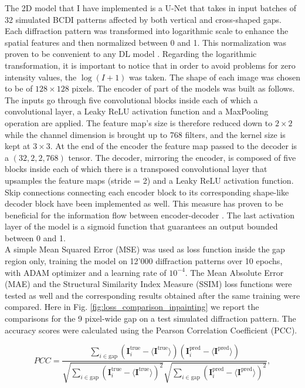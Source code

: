 The 2D model that I have implemented is a U-Net that takes in input batches of 32 simulated BCDI patterns affected 
by both vertical and cross-shaped gaps. Each diffraction pattern was transformed into logarithmic scale to enhance the 
spatial features and then normalized between 0 and 1. This normalization was proven to be convenient to any DL model \cite{efficientBackProp}.
Regarding the logarithmic transformation, it is important to notice that in order to avoid problems for zero intensity
values, the $\log(I+1)$ was taken.
The shape of each image was chosen to be of $128\times128$ pixels. The encoder of part of the models was built as follows. 
The inputs go through five convolutional blocks 
inside each of which a convolutional layer, a Leaky ReLU activation function and a MaxPooling operation are applied. 
The feature map's size is therefore reduced down to $2\times2$ while the channel dimension is brought up to 768 filters, 
and the kernel size is kept at $3\times3$. At the end of the encoder the feature map passed to the decoder is a 
$(32,2,2,768)$ tensor.
The decoder, mirroring the encoder, is composed of five blocks inside each of which there is a transposed convolutional layer
that upsamples the feature maps (stride = 2) and a Leaky ReLU activation function. Skip connections connecting each encoder block
to its corresponding shape-like decoder block have been implemented as well. This measure has proven to be beneficial 
for the information flow between encoder-decoder \cite{li_visualizing_2017}. The last activation layer of the model is 
a sigmoid function that guarantees an output bounded between 0 and 1. \\ 

A simple Mean Squared Error (MSE) was used as loss function inside the gap region only, training 
the model on 12'000 diffraction patterns over 10 epochs, with ADAM optimizer and a learning rate of $10^{-4}$. 
The Mean Absolute Error (MAE) and the Structural Similarity Index Measure (SSIM) \cite{ssim} loss functions were 
tested as well and the corresponding results obtained after the same training were compared.
Here in Fig. \ref{fig:loss_comparison_inpainting} we report the comparisons for the 9 pixel-wide gap on a test simulated diffraction
pattern. The accuracy scores were calculated using the Pearson Correlation Coefficient (PCC).

\begin{equation}
    PCC = \frac{\sum_{i\in \text{gap}}(\textbf{I}_i^{\text{true}} - 
    \langle \textbf{I}^{\text{true}}\rangle)(\textbf{I}_i^{\text{pred}}-
    \langle\textbf{I}^{\text{pred}}\rangle)}{\sqrt{\sum_{i\in \text{gap}}^{}(\textbf{I}_i^{\text{true}} - 
    \langle \textbf{I}^{\text{true}}\rangle)^2}\sqrt{\sum_{i\in \text{gap}}^{}(\textbf{I}_i^{\text{pred}}-
    \langle\textbf{I}^{\text{pred}}\rangle)^2}},
        \label{eq:accuracy}
\end{equation}

